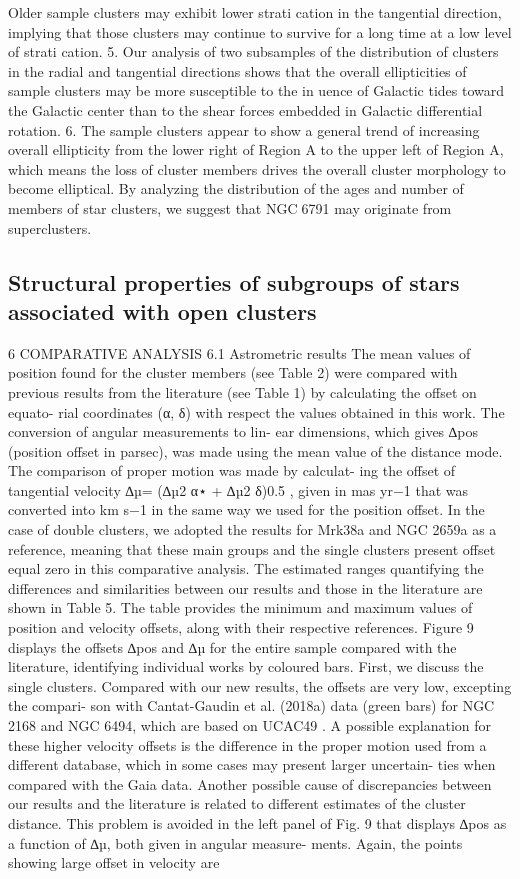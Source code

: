 \documentclass[../main.tex]{subfiles}
\begin{document}
{Older sample clusters may exhibit lower strati cation in
the tangential direction, implying that those clusters may
continue to survive for a long time at a low level of
strati cation.
5. Our analysis of two subsamples of the distribution of
clusters in the radial and tangential directions shows that
the overall ellipticities of sample clusters may be more
susceptible to the in uence of Galactic tides toward the
Galactic center than to the shear forces embedded in
Galactic differential rotation.
6. The sample clusters appear to show a general trend of
increasing overall ellipticity from the lower right of
Region A to the upper left of Region A, which means the
loss of cluster members drives the overall cluster
morphology to become elliptical. By analyzing the
distribution of the ages and number of members of star
clusters, we suggest that NGC6791 may originate from
superclusters.
\subsection{Structural properties of subgroups of stars associated with open clusters}

6 COMPARATIVE ANALYSIS
6.1 Astrometric results
The mean values of position found for the cluster members
(see Table 2) were compared with previous results from the
literature (see Table 1) by calculating the offset on equato-
rial coordinates (α, δ) with respect the values obtained in
this work. The conversion of angular measurements to lin-
ear dimensions, which gives ∆pos (position offset in parsec),
was made using the mean value of the distance mode.
The comparison of proper motion was made by calculat-
ing the offset of tangential velocity ∆µ= (∆µ2
α⋆ + ∆µ2
δ)0.5
,
given in mas yr−1 that was converted into km s−1 in the
same way we used for the position offset.
In the case of double clusters, we adopted the results for
Mrk38a and NGC 2659a as a reference, meaning that these
main groups and the single clusters present offset equal zero
in this comparative analysis.
The estimated ranges quantifying the differences and
similarities between our results and those in the literature
are shown in Table 5. The table provides the minimum and
maximum values of position and velocity offsets, along with
their respective references. Figure 9 displays the offsets ∆pos
and ∆µ for the entire sample compared with the literature,
identifying individual works by coloured bars.
First, we discuss the single clusters. Compared with our
new results, the offsets are very low, excepting the compari-
son with Cantat-Gaudin et al. (2018a) data (green bars) for
NGC 2168 and NGC 6494, which are based on UCAC49
.
A possible explanation for these higher velocity offsets is
the difference in the proper motion used from a different
database, which in some cases may present larger uncertain-
ties when compared with the Gaia data. Another possible
cause of discrepancies between our results and the literature
is related to different estimates of the cluster distance. This
problem is avoided in the left panel of Fig. 9 that displays
∆pos as a function of ∆µ, both given in angular measure-
ments. Again, the points showing large offset in velocity are

}
\end{document}
